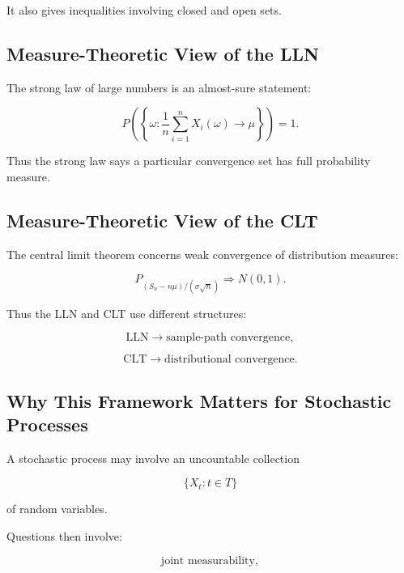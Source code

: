 It also gives inequalities involving closed and open sets.

\subsection{Measure-Theoretic View of the LLN}
\label{subsec:measure-view-lln}

The strong law of large numbers is an almost-sure statement:

\[
\boxed{
P
\left(
\left\{
\omega:
\frac1n
\sum_{i=1}^{n}
X_i(\omega)
\to
\mu
\right\}
\right)
=
1.
}
\]

Thus the strong law says a particular convergence set has full
probability measure.

\subsection{Measure-Theoretic View of the CLT}
\label{subsec:measure-view-clt}

The central limit theorem concerns weak convergence of distribution
measures:

\[
\boxed{
P_{
(S_n-n\mu)/(\sigma\sqrt{n})
}
\Rightarrow
N(0,1).
}
\]

Thus the LLN and CLT use different structures:

\[
\boxed{
\text{LLN}
\longrightarrow
\text{sample-path convergence},
}
\]

\[
\boxed{
\text{CLT}
\longrightarrow
\text{distributional convergence}.
}
\]

\subsection{Why This Framework Matters for Stochastic Processes}
\label{subsec:measure-framework-stochastic-processes}

A stochastic process may involve an uncountable collection

\[
\{X_t:t\in T\}
\]

of random variables.

Questions then involve:

\[
\text{joint measurability},
\]

